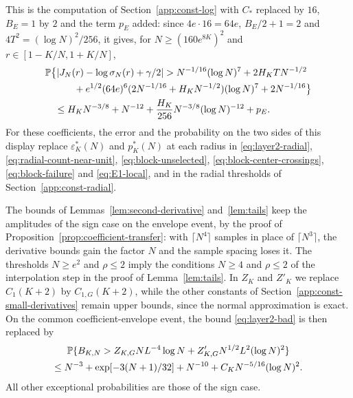 This is the computation of Section~\ref{app:const-log} with $C_*$
replaced by $16$, $B_E=1$ by $2$ and the term $p_E$ added: since
$4e\cdot16=64e$, $B_E/2+1=2$ and $4T^2=(\log N)^2/256$, it gives, for
$N\ge(160e^{8K})^2$ and $r\in[1-K/N,1+K/N]$,
\begin{align*}
 &\mathbb P\bigl\{|J_N(r)-\log\sigma_N(r)+\gamma/2|
 >N^{-1/16}(\log N)^7+2H_KTN^{-1/2}\\
 &\qquad\quad+e^{1/2}(64e)^6(2N^{-1/16}+H_KN^{-1/2})(\log N)^7+2N^{-1/16}\bigr\}\\
 &\quad\le H_KN^{-3/8}+N^{-12}
 +\frac{H_K}{256}N^{-3/8}(\log N)^{-12}+p_E.
\end{align*}
For these coefficients, the error and the probability on the two sides of
this display replace $\varepsilon_K^*(N)$ and $p_K^*(N)$ at each radius in
\eqref{eq:layer2-radial}, \eqref{eq:radial-count-near-unit},
\eqref{eq:block-unselected}, \eqref{eq:block-center-crossings},
\eqref{eq:block-failure} and \eqref{eq:E1-local}, and in the radial
thresholds of Section~\ref{app:const-radial}.

The bounds of Lemmas~\ref{lem:second-derivative} and~\ref{lem:tails} keep
the amplitudes of the sign case on the envelope event, by the proof of
Proposition~\ref{prop:coefficient-transfer}: with $\lceil N^4\rceil$
samples in place of $\lceil N^3\rceil$, the derivative bounds gain the
factor $N$ and the sample spacing loses it.
The thresholds $N\ge e^2$ and $\rho\le2$ imply the conditions $N\ge4$ and
$\rho\le2$ of the interpolation step in the proof of Lemma~\ref{lem:tails}.
In $Z_K$ and $Z'_K$ we replace $C_1(K+2)$ by $C_{1,G}(K+2)$, while the
other constants of Section~\ref{app:const-small-derivatives} remain upper
bounds, since the normal approximation is exact. On the common
coefficient-envelope event, the bound \eqref{eq:layer2-bad} is then
replaced by
\begin{multline*}
 \mathbb P\{B_{K,N}>Z_{K,G}NL^{-4}\log N+Z'_{K,G}N^{1/2}L^2(\log N)^2\}\\
 \le N^{-3}+\exp[-3(N+1)/32]+N^{-10}+C_KN^{-5/16}(\log N)^2.
\end{multline*}
All other exceptional probabilities are those of the sign case.

